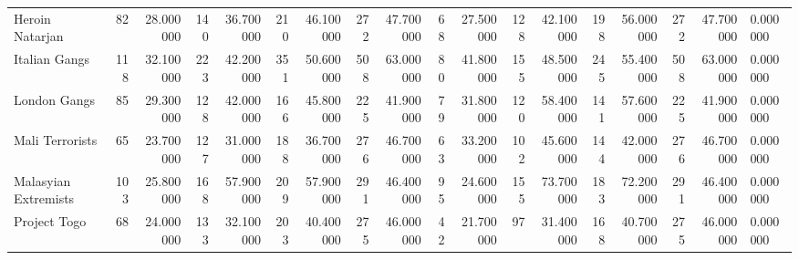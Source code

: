 \begin{tabular}{lrrrrrrrrrrrrrrrrl}
Heroin Natarjan & 82 & 28.000000 & 140 & 36.700000 & 210 & 46.100000 & 272 & 47.700000 & 68 & 27.500000 & 128 & 42.100000 & 198 & 56.000000 & 272 & 47.700000 & 0.000000 \\
Italian Gangs & 118 & 32.100000 & 223 & 42.200000 & 351 & 50.600000 & 508 & 63.000000 & 80 & 41.800000 & 155 & 48.500000 & 245 & 55.400000 & 508 & 63.000000 & 0.000000 \\
London Gangs & 85 & 29.300000 & 128 & 42.000000 & 166 & 45.800000 & 225 & 41.900000 & 79 & 31.800000 & 120 & 58.400000 & 141 & 57.600000 & 225 & 41.900000 & 0.000000 \\
Mali Terrorists & 65 & 23.700000 & 127 & 31.000000 & 188 & 36.700000 & 276 & 46.700000 & 63 & 33.200000 & 102 & 45.600000 & 144 & 42.000000 & 276 & 46.700000 & 0.000000 \\
Malasyian Extremists & 103 & 25.800000 & 168 & 57.900000 & 209 & 57.900000 & 291 & 46.400000 & 95 & 24.600000 & 155 & 73.700000 & 183 & 72.200000 & 291 & 46.400000 & 0.000000 \\
Project Togo & 68 & 24.000000 & 133 & 32.100000 & 203 & 40.400000 & 275 & 46.000000 & 42 & 21.700000 & 97 & 31.400000 & 168 & 40.700000 & 275 & 46.000000 & 0.000000 \\
\end{tabular}
